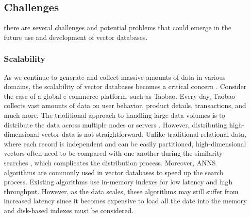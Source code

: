 
\subsection{Challenges}
there are several challenges and potential problems that could emerge in the future use and development of vector databases. 

\subsubsection{Scalability}
As we continue to generate and collect massive amounts of data in various domains, the scalability of vector databases becomes a critical concern \cite{DBLP:journals/tbd/JohnsonDJ21,DBLP:journals/jcisd/TingleTCGKDMI23}. 
Consider the case of a global e-commerce platform, such as Taobao. Every day, Taobao collects vast amounts of data on user behavior, product details, transactions, and much more.
%
The traditional approach to handling large data volumes is to distribute the data across multiple nodes or servers \cite{DBLP:conf/cidr/CherniackBBCCXZ03}. However, distributing high-dimensional vector data is not straightforward. Unlike traditional relational data, where each record is independent and can be easily partitioned, high-dimensional vectors often need to be compared with one another during the similarity searches \cite{DBLP:journals/access/YangZCY19}, which complicates the distribution process. 
%
%
Moreover, ANNS algorithms are commonly used in vector databases to speed up the search process. 
Existing algorithms use in-memory indexes for low latency and high throughput. However, as the data scales, these algorithms may still suffer from increased latency since it becomes expensive to load all the date into the memory and disk-based indexes must be considered. 

